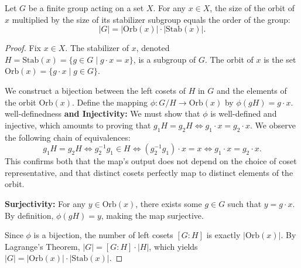 \documentclass[11pt]{scrartcl}
\begin{document}
\begin{theorem}
    Let $G$ be a finite group acting on a set $X$. For any $x \in X$, the size of the orbit of $x$ multiplied by the size of its stabilizer subgroup equals the order of the group:
    \[ |G| = |\text{Orb}(x)| \cdot |\text{Stab}(x)|. \]
\end{theorem}
\begin{proof}
    Fix $x \in X$. The stabilizer of $x$, denoted $H = \text{Stab}(x) = \{g \in G \mid g \cdot x = x\}$, is a subgroup of $G$. The orbit of $x$ is the set $\text{Orb}(x) = \{g \cdot x \mid g \in G\}$.
    
     We construct a bijection between the left cosets of $H$ in $G$ and the elements of the orbit $\text{Orb}(x)$. Define the mapping $\phi \colon G/H \to \text{Orb}(x)$ by $\phi(gH) = g \cdot x$. 
well-definedness
 \textbf{ and Injectivity:} We must show that $\phi$ is well-defined and injective, which amounts to proving that $g_1 H = g_2 H \iff g_1 \cdot x = g_2 \cdot x$. We observe the following chain of equivalences:
    \[ g_1 H = g_2 H \iff g_2^{-1}g_1 \in H \iff (g_2^{-1}g_1) \cdot x = x \iff g_1 \cdot x = g_2 \cdot x. \]
    This confirms both that the map's output does not depend on the choice of coset representative, and that distinct cosets perfectly map to distinct elements of the orbit.
    
    \textbf{Surjectivity:} For any $y \in \text{Orb}(x)$, there exists some $g \in G$ such that $y = g \cdot x$. By definition, $\phi(gH) = y$, making the map surjective.
    
    Since $\phi$ is a bijection, the number of left cosets $[G:H]$ is exactly $|\text{Orb}(x)|$. By Lagrange's Theorem, $|G| = [G:H] \cdot |H|$, which yields $|G| = |\text{Orb}(x)| \cdot |\text{Stab}(x)|$.
\end{proof}
\end{document}
